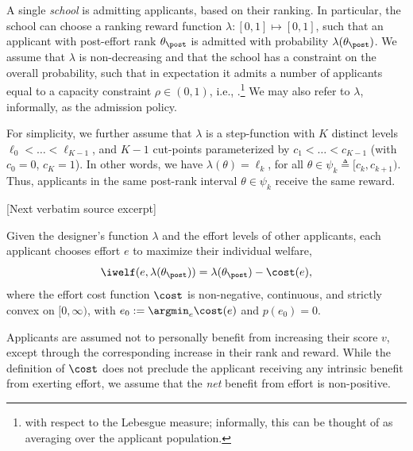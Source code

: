 \documentclass[10pt]{article}
\begin{document}
\begin{ReviewVerbatim}
{ A single \textit{school} is admitting applicants, based on their ranking. In particular, the school can choose a ranking reward function $\lambda : [0, 1] \mapsto [0, 1]$, such that an applicant with post-effort rank $\theta_\post$ is admitted with probability $\lambda(\theta_\post)$. We assume that $\lambda$ is non-decreasing and that the school has a constraint on the overall probability, such that in expectation it admits a number of applicants equal to {a} capacity constraint  $\rho \in (0,1)$, i.e., \lledit{$\E_{\theta_\post}[\lambda(\theta_\post)] = \rho $}.\footnote{ with respect to the Lebesgue measure; informally, this can be thought of as averaging over the applicant population.} We may also refer to $\lambda$, informally, as the admission policy.



For simplicity, we further assume that $\lambda$ is a step-function with $K$ distinct levels $\ell_0 < \dots < \ell_{K-1}$, and $K-1$ cut-points parameterized by $c_1< \dots < c_{K-1}$ (with $c_0 = 0$, $c_K = 1$). %
In other words, we have $\lambda(\theta) = \ell_k$, for all $\theta \in \psi_k \triangleq [c_{k}, c_{k+1})$. Thus, applicants in the same post-rank interval $\theta \in \psi_k$ receive the same reward.

[Next verbatim source excerpt]

 Given the designer's function $\lambda$ and the effort levels of other applicants, each applicant chooses effort $e$ to maximize their individual welfare, %
\begin{equation*}
	\iwelf(e, \lambda(\theta_\post)) = \lambda(\theta_\post) - \cost(e),
\end{equation*}
where the effort cost function $\cost$ is non-negative, continuous, and strictly convex {on $[0,\infty)$, with $e_0:=\argmin_e \cost(e)$ and $p(e_0) = 0$.}

Applicants are assumed not to personally benefit from increasing their score $v$, except through the corresponding increase in their rank and reward. While the definition of $\cost$ does not preclude the applicant receiving any intrinsic benefit from exerting effort, we assume that the \emph{net} benefit from effort is non-positive.

}
\end{ReviewVerbatim}
\end{document}
